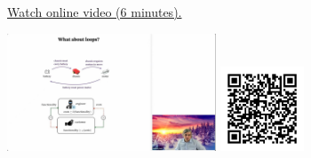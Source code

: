 
\begin{minipage}{10cm}
    \href{https://act4e-spring21.netlify.app/videos/spring2021-functorial-comp-a:solving-queries:solving-loop.html}{Watch online video (6 minutes).}
        
    \href{https://act4e-spring21.netlify.app/videos/spring2021-functorial-comp-a:solving-queries:solving-loop.html}{\includegraphics[height=3.5cm]{spring2021-functorial-comp-a:solving-queries:solving-loop/thumbnails.jpg}}
    \href{https://act4e-spring21.netlify.app/videos/spring2021-functorial-comp-a:solving-queries:solving-loop.html}{\includegraphics[height=2.5cm]{spring2021-functorial-comp-a:solving-queries:solving-loop/qrcode.png}}
\end{minipage}
